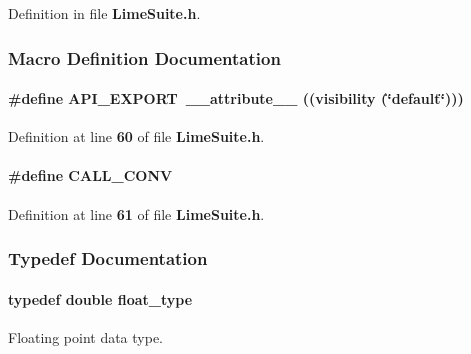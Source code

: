 Definition in file {\bf Lime\+Suite.\+h}.



\subsubsection{Macro Definition Documentation}
\paragraph[{A\+P\+I\+\_\+\+E\+X\+P\+O\+RT}]{\setlength{\rightskip}{0pt plus 5cm}\#define A\+P\+I\+\_\+\+E\+X\+P\+O\+RT~{\bf \+\_\+\+\_\+attribute\+\_\+\+\_\+} ((visibility (\char`\"{}default\char`\"{})))}\label{LimeSuite_8h_a5e3652cae8b48c1ad174f0b06bbd06d0}


Definition at line {\bf 60} of file {\bf Lime\+Suite.\+h}.

\paragraph[{C\+A\+L\+L\+\_\+\+C\+O\+NV}]{\setlength{\rightskip}{0pt plus 5cm}\#define C\+A\+L\+L\+\_\+\+C\+O\+NV}\label{LimeSuite_8h_a66285a1fe575693f5f275b212891222e}


Definition at line {\bf 61} of file {\bf Lime\+Suite.\+h}.



\subsubsection{Typedef Documentation}
\paragraph[{float\+\_\+type}]{\setlength{\rightskip}{0pt plus 5cm}typedef double {\bf float\+\_\+type}}\label{LimeSuite_8h_a25d00a4a2950431bf70b51adcc7cb430}


Floating point data type. 



